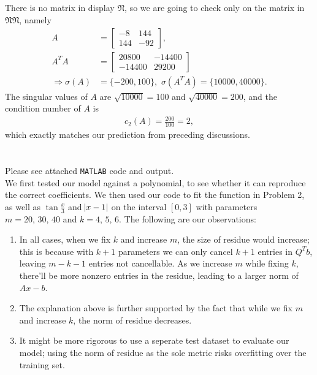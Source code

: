 \documentclass[11pt]{article}
\begin{document}
\subsection{}
There is no matrix in display $\mathfrak{N}$, so we are going to check only on the matrix in $\mathfrak{NN}$, namely
\begin{equation}\begin{split}A&=\begin{bmatrix} -8 & 144 \\ 144 & -92\end{bmatrix},\\
A^TA &= \begin{bmatrix} 20800 & -14400 \\ -14400 & 29200\end{bmatrix} \\
\Rightarrow \sigma(A) & = \{-200, 100 \}, \,\,\sigma(A^TA) = \{10000, 40000\}.
\end{split}\nonumber\end{equation} 
The singular values of $A$ are $\sqrt{10000} = 100$ and $\sqrt{40000} = 200$, and the condition number of $A$ is 
\begin{equation}\begin{split} 
c_2(A) = \frac{200}{100}=2,
\end{split}\nonumber\end{equation} 
which exactly matches our prediction from preceding discussions.

\section{}
Please see attached \texttt{MATLAB} code and output.\\[0.3cm]
We first tested our model against a polynomial, to see whether it can reproduce the correct coefficients. We then used our code to fit the function in Problem 2, as well as $\tan\frac x3$ and $\abs{x-1}$ on the interval $[0,3]$ with parameters $m = 20,\,30,\,40$ and $k=4,\,5,\,6$. The following are our observations:
\begin{enumerate}
\item In all cases, when we fix $k$ and increase $m$, the size of residue would increase; this is because with $k+1$ parameters we can only cancel $k+1$ entries in $Q^Tb$, leaving $m-k-1$ entries not cancellable. As we increase $m$ while fixing $k$, there'll be more nonzero entries in the residue, leading to a larger norm of $Ax-b$.
\item The explanation above is further supported by the fact that while we fix $m$ and increase $k$, the norm of residue decreases.
\item It might be more rigorous to use a seperate test dataset to evaluate our model; using the norm of residue as the sole metric risks overfitting over the training set.
\end{enumerate}
  
\end{document}
